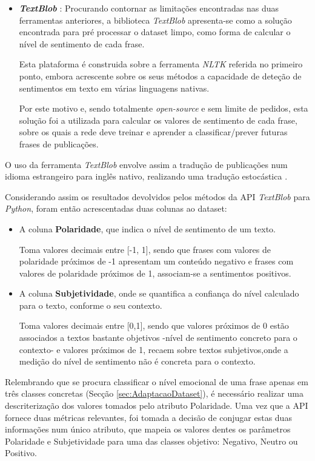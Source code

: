 \begin{itemize}
    \item \textit{\textbf{TextBlob}} \cite{textblob}: Procurando contornar as limitações encontradas nas duas ferramentas anteriores, a biblioteca \textit{TextBlob} apresenta-se como a solução encontrada para pré processar o dataset limpo, como forma de calcular o nível de sentimento de cada frase. 
    
    Esta plataforma é construida sobre a ferramenta \textit{NLTK} referida no primeiro ponto, embora acrescente sobre os seus métodos a capacidade de deteção de sentimentos em texto em várias linguagens nativas. 
    
    Por este motivo e, sendo totalmente \textit{open-source} e sem limite de pedidos, esta solução foi a utilizada para calcular os valores de sentimento de cada frase, sobre os quais a rede deve treinar e aprender a classificar/prever futuras frases de publicações. 

\end{itemize}

O uso da ferramenta \textit{TextBlob} envolve assim a tradução de publicações num idioma estrangeiro para inglês nativo, realizando uma tradução estocástica \cite{RepresentacaoTexto}. 

Considerando assim os resultados devolvidos pelos métodos da API \textit{TextBlob} para \textit{Python}, foram então acrescentadas duas colunas ao dataset:
\begin{itemize}
    \item A coluna \textbf{Polaridade}, que indica o nível de sentimento de um texto. 
        
    Toma valores decimais entre [-1, 1], sendo que frases com valores de polaridade próximos de -1 apresentam um conteúdo negativo e frases com valores de polaridade próximos de 1, associam-se a sentimentos positivos. 
        
    \item A coluna \textbf{Subjetividade}, onde se quantifica a confiança do nível calculado para o texto, conforme o seu contexto. 
        
    Toma valores decimais entre [0,1], sendo que valores próximos de 0 estão associados a textos bastante objetivos -nível de sentimento concreto para o contexto- e valores próximos de 1, recaem sobre textos subjetivos,onde a medição do nível de sentimento não é concreta para o contexto.
\end{itemize}

Relembrando que se procura classificar o nível emocional de uma frase apenas em três classes concretas (Secção \ref{sec:AdaptacaoDataset}), é necessário realizar uma descriterização dos valores tomados pelo atributo Polaridade. 
Uma vez que a API fornece duas métricas relevantes, foi tomada a decisão de conjugar estas duas informações num único atributo, que mapeia os valores dentes os parâmetros Polaridade e Subjetividade para uma das classes objetivo: Negativo, Neutro ou Positivo.  

